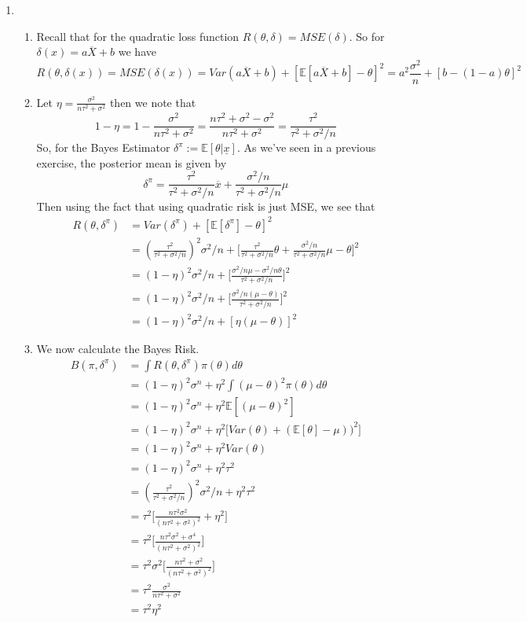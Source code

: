 \documentclass[12pt]{article}  %
\newcommand{\E}{{\mathbb{E}}}
\begin{document}
\begin{enumerate}
\item 
	\begin{enumerate}
		\item Recall that for the quadratic loss function $R(\theta, \delta) = MSE(\delta)$. So for $\delta(x) = a\overline{X} + b$ we have $$R(\theta, \delta(x)) = MSE(\delta(x)) = Var(a\overline{X} + b) + [\E[a\overline{X} + b] - \theta]^2 = a^2\frac{\sigma^2}{n} + [b - (1-a)\theta]^2$$
		\item Let $\eta = \frac{\sigma^2}{n\tau^2 + \sigma^2}$ then we note that $$1 - \eta = 1 - \frac{\sigma^2}{n\tau^2 + \sigma^2} = \frac{n\tau^2 + \sigma^2 - \sigma^2}{n\tau^2 + \sigma^2} = \frac{\tau^2}{\tau^2 + \sigma^2/n}$$ So, for the Bayes Estimator $\delta^{\pi}:= \E[\theta|\underline{x}]$. As we've seen in a previous exercise, the posterior mean is given by $$\delta^{\pi} = \frac{\tau^2}{\tau^2 + \sigma^2/n}\overline{x} + \frac{\sigma^2/n}{\tau^2 + \sigma^2/n}\mu$$
		Then using the fact that using quadratic risk is just MSE, we see that 
		\begin{align*}
			R(\theta,\delta^{\pi}) &= Var(\delta^{\pi}) + [\E[\delta^{\pi}] -\theta]^2\\
			&= \left(\frac{\tau^2}{\tau^2 + \sigma^2/n}\right)^2\sigma^2/n + \Big[\frac{\tau^2}{\tau^2+\sigma^2/n}\theta + \frac{\sigma^2/n}{\tau^2+\sigma^2/n}\mu - \theta\Big]^2\\
			&= (1-\eta)^2\sigma^2/n + \Big[\frac{\sigma^2/n\mu - \sigma^2/n\theta}{\tau^2+\sigma^2/n}\Big]^2\\
			&= (1-\eta)^2\sigma^2/n + \Big[\frac{\sigma^2/n(\mu -\theta)}{\tau^2+\sigma^2/n}\Big]^2\\
			&= (1-\eta)^2\sigma^2/n + [\eta(\mu - \theta)]^2
		\end{align*}

		\item We now calculate the Bayes Risk. 
		\begin{align*}
		B(\pi,\delta^{\pi}) &= \int R(\theta , \delta^{\pi})\pi(\theta)d\theta\\
		&= (1-\eta)^2\sigma^n + \eta^2\int (\mu -\theta)^2\pi(\theta)d\theta\\
		&= (1-\eta)^2\sigma^n + \eta^2\E[(\mu-\theta)^2]\\
		&= (1-\eta)^2\sigma^n + \eta^2\Big[Var(\theta) + (\E[\theta]-\mu))^2\Big]\\
		&= (1-\eta)^2\sigma^n + \eta^2Var(\theta)\\
		&= (1-\eta)^2\sigma^n + \eta^2\tau^2\\
		&= (\frac{\tau^2}{\tau^2+\sigma^2/n})^2\sigma^2/n + \eta^2\tau^2\\
		&= \tau^2\Big[\frac{n\tau^2\sigma^2}{(n\tau^2+\sigma^2)^2} + \eta^2\Big]\\
		&= \tau^2\Big[\frac{n\tau^2\sigma^2 + \sigma^4}{(n\tau^2+\sigma^2)^2}\Big]\\
		&= \tau^2\sigma^2\Big[\frac{n\tau^2 + \sigma^2}{(n\tau^2+\sigma^2)^2}\Big]\\
		&= \tau^2\frac{\sigma^2}{n\tau^2 + \sigma^2}\\
		&= \tau^2\eta^2
		\end{align*}


\end{enumerate}
\end{enumerate}
\end{document}

